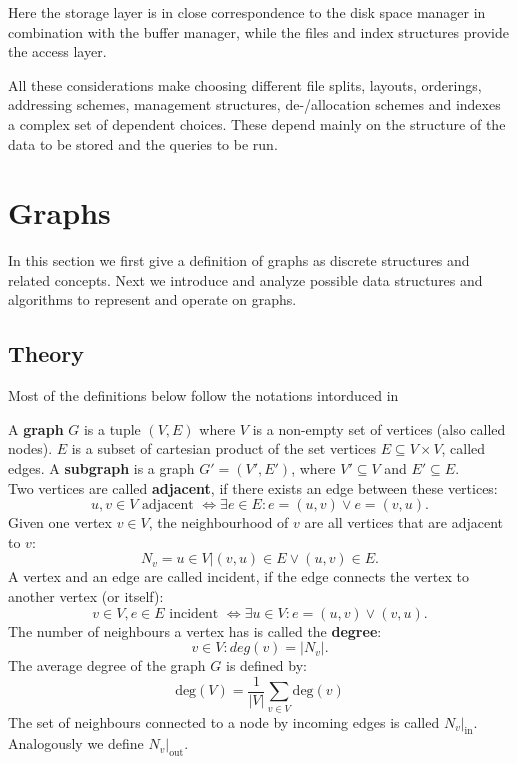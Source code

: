         Here the storage layer is in close correspondence to the disk space manager in combination with the buffer manager, while the files and index structures provide the access layer.

        All these considerations make choosing different file splits, layouts, orderings, addressing schemes, management structures, de-/allocation schemes and indexes a complex set of dependent choices. 
        These depend mainly on the structure of the data to be stored and the queries to be run.
        


\section{Graphs
}\label{\positionnumber}
In this section we first give a definition of graphs as discrete structures and related concepts. Next we introduce and analyze possible data structures and algorithms to represent and operate on graphs. \\
        \subsection{Theory}\label{\positionnumber}
            Most of the definitions below follow the notations intorduced in ~\autocite{steger2007diskrete, Gross1998GraphTA, aho1974design, cormen2009introduction, Goodrich2014AlgorithmDA}
        
            A \textbf{graph} $G$ is a tuple $(V, E)$ where $V$ is a non-empty set of vertices (also called nodes). 
            $E$ is a subset of cartesian product of the set vertices $E \subseteq V \times V$, called edges.
            A \textbf{subgraph} is a graph $G' = (V', E')$, where $V' \subseteq V$ and $E' \subseteq E$. \\
            
            Two vertices are called \textbf{adjacent}, if there exists an edge between these vertices: 
            \[ u,v \in V \text{ adjacent } \Leftrightarrow \exists e \in E: e = (u, v) \vee e= (v, u).\]
            Given one vertex $v \in V$, the neighbourhood of $v$ are all vertices that are adjacent to $v$: 
            \[N_v = {u \in V | (v, u) \in E \vee (u, v) \in E}.\] 
            A vertex and an edge are called incident, if the edge connects the vertex to another vertex (or itself): 
            \[v \in V, e\in E \text{ incident } \Leftrightarrow \exists u \in V: e = (u,v) \vee (v,u).\]
            The number of neighbours a vertex has is called the \textbf{degree}: 
            \[v \in V: deg(v) = |N_v|.\]
            The average degree of the graph $G$ is defined by:
            \[ \text{deg}(V) = \frac{1}{|V|} \sum_{v \in V}\text{deg}(v)\]
            The set of neighbours connected to a node by incoming edges is called $N_v |_\text{in}$. Analogously we define $N_v |_\text{out}$. \\
            

